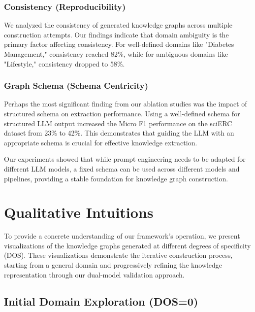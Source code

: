 \documentclass[11pt]{article}
\begin{document}
\subsubsection{Consistency (Reproducibility)}

We analyzed the consistency of generated knowledge graphs across multiple construction attempts. Our findings indicate that domain ambiguity is the primary factor affecting consistency. For well-defined domains like "Diabetes Management," consistency reached 82\%, while for ambiguous domains like "Lifestyle," consistency dropped to 58\%.

\subsubsection{Graph Schema (Schema Centricity)}

Perhaps the most significant finding from our ablation studies was the impact of structured schema on extraction performance. Using a well-defined schema for structured LLM output increased the Micro F1 performance on the sciERC dataset from 23\% to 42\%. This demonstrates that guiding the LLM with an appropriate schema is crucial for effective knowledge extraction.

Our experiments showed that while prompt engineering needs to be adapted for different LLM models, a fixed schema can be used across different models and pipelines, providing a stable foundation for knowledge graph construction.

\section{Qualitative Intuitions}

To provide a concrete understanding of our framework's operation, we present visualizations of the knowledge graphs generated at different degrees of specificity (DOS). These visualizations demonstrate the iterative construction process, starting from a general domain and progressively refining the knowledge representation through our dual-model validation approach.

\subsection{Initial Domain Exploration (DOS=0)}
\end{document}

